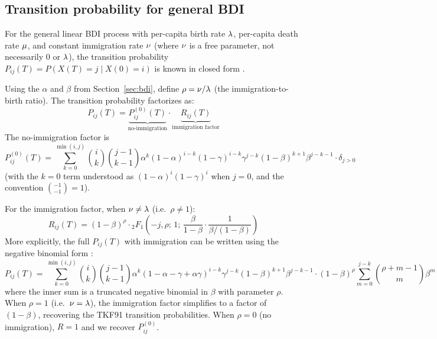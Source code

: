 \subsection{Transition probability for general BDI}

For the general linear BDI process with per-capita birth rate $\lambda$,
per-capita death rate $\mu$, and constant immigration rate $\nu$
(where $\nu$ is a free parameter, not necessarily $0$ or $\lambda$),
the transition probability $P_{ij}(T) = P(X(T) = j \mid X(0) = i)$ is known in closed form
\cite{Kendall1948}.

Using the $\alpha$ and $\beta$ from Section~\ref{sec:bdi},
define $\rho = \nu / \lambda$ (the immigration-to-birth ratio).
The transition probability factorizes as:
\begin{equation}\label{eq:pij-general}
P_{ij}(T) = \underbrace{P_{ij}^{(0)}(T)}_{\text{no-immigration}} \cdot
\underbrace{R_{ij}(T)}_{\text{immigration factor}}
\end{equation}
The no-immigration factor is
\begin{equation}\label{eq:pij-noimm}
P_{ij}^{(0)}(T) = \sum_{k=0}^{\min(i,j)} \binom{i}{k} \binom{j-1}{k-1}
  \alpha^k (1-\alpha)^{i-k} (1-\gamma)^{i-k}
  \gamma^{j-k} (1-\beta)^{k+1} \beta^{j-k-1} \cdot \delta_{j>0}
\end{equation}
(with the $k=0$ term understood as $(1-\alpha)^i (1-\gamma)^i$ when $j=0$,
and the convention $\binom{-1}{-1} = 1$).

For the immigration factor,
when $\nu \neq \lambda$ (i.e.\ $\rho \neq 1$):
\begin{equation}\label{eq:imm-factor}
R_{ij}(T) = (1-\beta)^{\rho} \cdot
{}_2F_1\!\left(-j, \rho;\, 1;\, \frac{\beta}{1-\beta} \cdot \frac{1}{\beta/(1-\beta)}\right)
\end{equation}
More explicitly, the full $P_{ij}(T)$ with immigration can be written
using the negative binomial form \cite{Kendall1948}:
\begin{equation}\label{eq:pij-full}
P_{ij}(T) = \sum_{k=0}^{\min(i,j)}
  \binom{i}{k}\binom{j-1}{k-1}
  \alpha^k (1-\alpha-\gamma+\alpha\gamma)^{i-k}
  \gamma^{j-k}(1-\beta)^{k+1}\beta^{j-k-1}
  \cdot (1-\beta)^{\rho}
  \sum_{m=0}^{j-k} \binom{\rho+m-1}{m}\beta^m
\end{equation}
where the inner sum is a truncated negative binomial in $\beta$ with parameter $\rho$.
When $\rho = 1$ (i.e.\ $\nu = \lambda$),
the immigration factor simplifies to a factor of $(1-\beta)$, recovering the TKF91 transition probabilities.
When $\rho = 0$ (no immigration), $R = 1$ and we recover $P_{ij}^{(0)}$.

